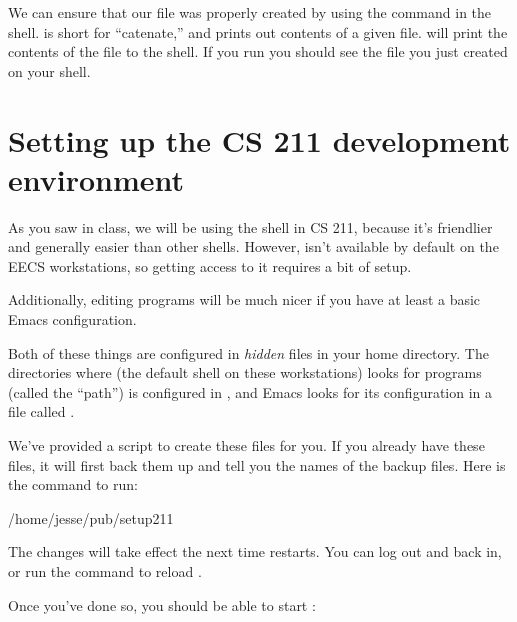 \documentclass{tufte-handout}
\begin{document}
We can ensure that our file was properly created by using the
 command in the shell.  is short for
``catenate,'' and prints out contents of a given file.   will print the contents of the file to the shell. If
you run  you should see the file you just
created on your shell.

\section{Setting up the CS 211 development environment}

As you saw in class, we will be using the  shell in CS
211, because it’s friendlier and generally easier than other shells.
However,  isn’t available by default on the EECS
workstations, so getting access to it requires a bit of setup.

Additionally, editing programs will be much nicer if you have at least a
basic Emacs configuration.

Both of these things are configured in \emph{hidden} files in your home directory. The
directories where  (the default shell on these
workstations) looks for programs (called the ``path'') is configured in
, and Emacs looks for its configuration in a file
called .

We’ve provided a script to create these files for you. If you already
have these files, it will first back them up and tell you the names of
the backup files. Here is the command to run:

\begin{CmdLine*}
  \C /home/jesse/pub/setup211\\
\end{CmdLine*}


\noindent The changes will take effect the next time 
restarts. You can log out and back in, or run the command  to reload .

Once you’ve done so, you should be able to start :
\end{document}
